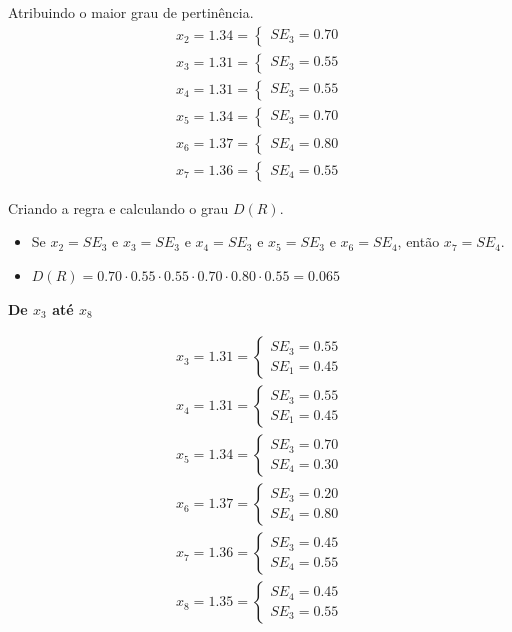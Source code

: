 \documentclass[12pt]{article}
\begin{document}
Atribuindo o maior grau de pertinência.
\begin{align*}
	x_2=1.34=\begin{cases}
		SE_3=0.70
	\end{cases}\\
	x_3=1.31=\begin{cases}
		SE_3=0.55
	\end{cases}\\
	x_4=1.31=\begin{cases}
		SE_3=0.55
	\end{cases}\\
	x_5=1.34=\begin{cases}
		SE_3=0.70
	\end{cases}\\
	x_6=1.37=\begin{cases}
		SE_4=0.80
	\end{cases}\\
	x_7=1.36=\begin{cases}
		SE_4=0.55
	\end{cases}
\end{align*}

Criando a regra e calculando o grau $D(R)$.
\begin{itemize}
	\item Se $x_2=SE_3$ e $x_3=SE_3$ e $x_4=SE_3$ e $x_5=SE_3$ e $x_6=SE_4$, então $x_7=SE_4$.
	\item $D(R)=0.70\cdot0.55\cdot0.55\cdot0.70\cdot0.80\cdot0.55=0.065$
\end{itemize}

\textbf{De $x_3$ até $x_8$}

\begin{align*}
	x_3=1.31=\begin{cases}
		SE_3=0.55\\SE_1=0.45
	\end{cases}\\
	x_4=1.31=\begin{cases}
		SE_3=0.55\\SE_1=0.45
	\end{cases}\\
	x_5=1.34=\begin{cases}
		SE_3=0.70\\SE_4=0.30
	\end{cases}\\
	x_6=1.37=\begin{cases}
		SE_3=0.20\\SE_4=0.80
	\end{cases}\\
	x_7=1.36=\begin{cases}
		SE_3=0.45\\SE_4=0.55
	\end{cases}\\
	x_8=1.35=\begin{cases}
		SE_4=0.45\\SE_3=0.55
		\end{cases}
\end{align*}
\end{document}
